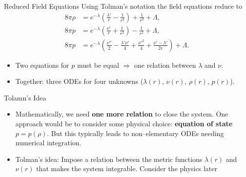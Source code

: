 \documentclass[11pt]{beamer}
\begin{document}
\begin{frame}{Reduced Field Equations}
  \small
  Using Tolman’s notation the field equations reduce to
  \begin{align*}
    8\pi \rho &= e^{-\lambda} \left(\frac{\lambda'}{r} - \frac{1}{r^2}\right) + \frac{1}{r^2} + \Lambda, \\
    8\pi p &= e^{-\lambda} \left(\frac{\nu'}{r} + \frac{1}{r^2}\right) - \frac{1}{r^2} + \Lambda, \\
    8\pi p &= e^{-\lambda} \left(
      \frac{\nu''}{2} - \frac{\lambda' \nu'}{4}
      + \frac{\nu'^2}{4} + \frac{\nu' - \lambda'}{2r}
    \right) + \Lambda .
  \end{align*}
  \begin{itemize}
    \item Two equations for $p$ must be equal $\Rightarrow$ one relation between $\lambda$ and $\nu$.
    \item Together: three ODEs for four unknowns ($\lambda (r)$, $\nu (r)$, $\rho (r)$, $p (r)$).
  \end{itemize}
\end{frame}


\begin{frame}{Tolamn's Idea}
  \begin{itemize}
    \item Mathematically, we need \textbf{one more relation} to close the system. One approach would be to consider some physical choice: \textbf{equation of state} $p=p(\rho)$. But this typically leads to non–elementary ODEs needing numerical integration.

    \item Tolman’s idea:
        Impose a relation between the metric functions $\lambda(r)$ and $\nu(r)$ that makes the system integrable. Consider the physics later
  \end{itemize}
\end{frame}
\end{document}
